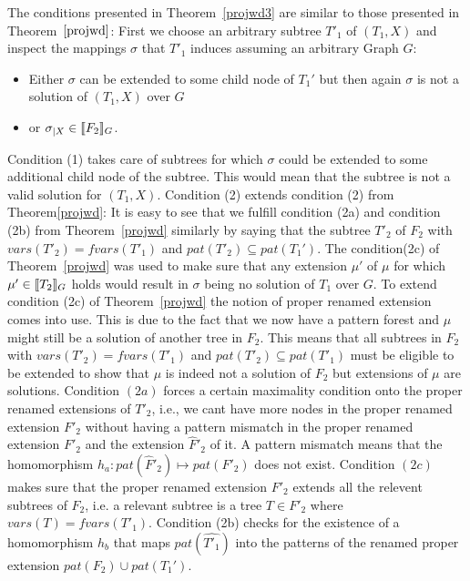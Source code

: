 \begin{proofidea}
 The conditions presented in Theorem~\ref{projwd3} are similar to those presented in
 Theorem~$\ref{projwd}$: First we choose an arbitrary subtree $T'_1$ of $(T_1,X)$ and
 inspect the mappings $\sigma$ that $T'_1$ induces assuming an arbitrary Graph
 $G$: 
 \begin{itemize}
	 \item Either $\sigma$ can be extended to some child node of $T_1'$ but then
 again $\sigma$ is not a solution of $(T_1,X)$ over $G$
	 \item  or $\sigma_{|X} \in \llbracket F_2\rrbracket_G$.
\end{itemize}
Condition (1) takes care of subtrees for which $\sigma$ could be extended
to some additional child node of the subtree. This would mean that the subtree
is not a valid solution for $(T_1,X)$.
Condition (2) extends condition (2) from Theorem\ref{projwd}:
It is easy to see that we fulfill condition (2a) and condition (2b)
from Theorem~\ref{projwd} similarly by saying that the subtree $T'_2$ of $F_2$
with $vars(T'_2) = fvars(T'_1)$ and $pat(T'_2) \subseteq pat(T_1')$.  
The condition(2c) of Theorem~\ref{projwd} was used to make sure
that any extension $\mu'$ of $\mu$ for which $\mu' \in \llbracket T_2\rrbracket_G$ holds would
result in $\sigma$ being no solution of $T_1$ over $G$. To extend
condition (2c) of Theorem~\ref{projwd} the notion of proper renamed extension
comes into use. This is due to the fact that we now have a pattern forest and
$\mu$ might still be a solution of another tree in $F_2$. This means that all
subtrees in $F_2$ with $vars(T'_2) = fvars(T'_1)$ and $pat(T'_2) \subseteq
pat(T'_1)$ must be eligible to be extended to show that $\mu$ is indeed not a
solution of $F_2$ but extensions of $\mu$ are solutions.
Condition $(2a)$ forces a certain maximality condition onto the proper renamed
extensions of $T'_2$, i.e., we cant have more nodes in the proper renamed
extension $F'_2$ without having a pattern mismatch in the proper renamed
extension $F'_2$ and
the extension $\hat{F}'_2$ of it. A pattern mismatch means that the homomorphism $h_a:
pat(\hat{F}'_2) \mapsto pat(F'_2)$ does not exist.
Condition $(2c)$ makes sure that the proper renamed extension $F'_2$
extends all the relevent subtrees of $F_2$, i.e. a relevant subtree is a tree $T
\in F'_2$ where $vars(T)  =fvars(T'_1)$.
Condition (2b) checks for the existence of a homomorphism $h_b$ that maps
$pat(\hat{T'_1})$ into the patterns of the renamed proper extension $pat(F_2)
\cup pat(T_1')$.

\end{proofidea}

